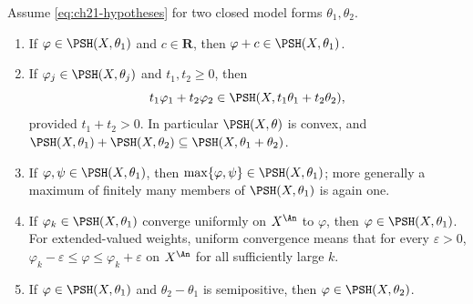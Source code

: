 \begin{theorem}
\label{thm:ch21-stability}
Assume \eqref{eq:ch21-hypotheses} for two closed model forms
$\theta_1,\theta_2$.
\begin{enumerate}
\item\label{itm:ch21-stab:const}
If $\varphi\in\PSH(X,\theta_1)$ and $c\in\mathbf R$, then
$\varphi+c\in\PSH(X,\theta_1)$.
\item\label{itm:ch21-stab:sum}
If $\varphi_j\in\PSH(X,\theta_j)$ and $t_1,t_2\geq0$, then
\[
 t_1\varphi_1+t_2\varphi_2\in\PSH(X,t_1\theta_1+t_2\theta_2),
\]
provided $t_1+t_2>0$.  In particular $\PSH(X,\theta)$ is convex, and
$\PSH(X,\theta_1)+\PSH(X,\theta_2)\subseteq\PSH(X,\theta_1+\theta_2)$.
\item\label{itm:ch21-stab:max}
If $\varphi,\psi\in\PSH(X,\theta_1)$, then
$\max\{\varphi,\psi\}\in\PSH(X,\theta_1)$; more generally a maximum of
finitely many members of $\PSH(X,\theta_1)$ is again one.
\item\label{itm:ch21-stab:unif}
If $\varphi_k\in\PSH(X,\theta_1)$ converge uniformly on $X^{\An}$ to
$\varphi$, then $\varphi\in\PSH(X,\theta_1)$.  For extended-valued
weights, uniform convergence means that for every $\varepsilon>0$,
$\varphi_k-\varepsilon\leq\varphi\leq\varphi_k+\varepsilon$ on
$X^{\An}$ for all sufficiently large $k$.
\item\label{itm:ch21-stab:mono}
If $\varphi\in\PSH(X,\theta_1)$ and $\theta_2-\theta_1$ is semipositive,
then $\varphi\in\PSH(X,\theta_2)$.
\end{enumerate}
\end{theorem}

